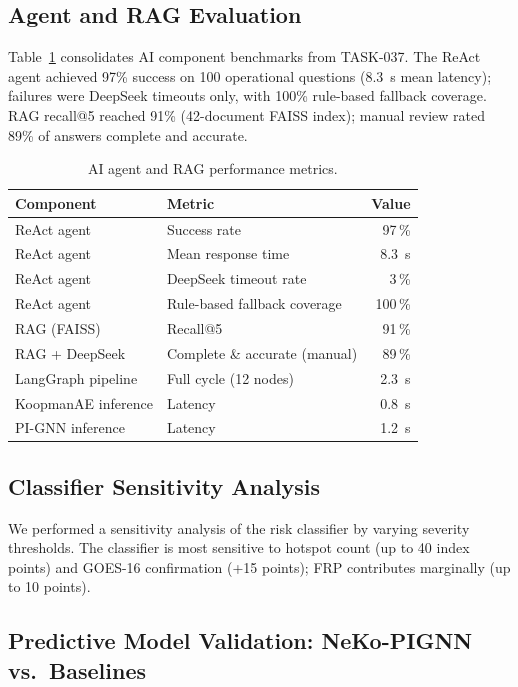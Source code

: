 \documentclass[preprint,times,numbers]{elsarticle}
\begin{document}
\subsection{Agent and RAG Evaluation}
\label{sec:agent-rag}

Table~\ref{tab:agent-perf} consolidates AI component benchmarks from TASK-037. The ReAct agent achieved 97\% success on 100 operational questions (8.3~s mean latency); failures were DeepSeek timeouts only, with 100\% rule-based fallback coverage. RAG recall@5 reached 91\% (42-document FAISS index); manual review rated 89\% of answers complete and accurate.

\begin{table}[htbp]
\centering
\caption{AI agent and RAG performance metrics.}
\label{tab:agent-perf}
\small
\begin{tabular}{@{}llr@{}}
\toprule
\textbf{Component} & \textbf{Metric} & \textbf{Value} \\ 
\midrule
ReAct agent & Success rate & 97\,\% \\
ReAct agent & Mean response time & 8.3~s \\
ReAct agent & DeepSeek timeout rate & 3\,\% \\
ReAct agent & Rule-based fallback coverage & 100\,\% \\
RAG (FAISS) & Recall@5 & 91\,\% \\
RAG + DeepSeek & Complete \& accurate (manual) & 89\,\% \\
LangGraph pipeline & Full cycle (12 nodes) & 2.3~s \\
KoopmanAE inference & Latency & 0.8~s \\
PI-GNN inference & Latency & 1.2~s \\
\bottomrule
\end{tabular}
\end{table}

\subsection{Classifier Sensitivity Analysis}

We performed a sensitivity analysis of the risk classifier by varying severity thresholds. The classifier is most sensitive to hotspot count (up to 40 index points) and GOES-16 confirmation (+15 points); FRP contributes marginally (up to 10 points).

\subsection{Predictive Model Validation: NeKo-PIGNN vs.\ Baselines}
\label{sec:model_validation}
\end{document}
